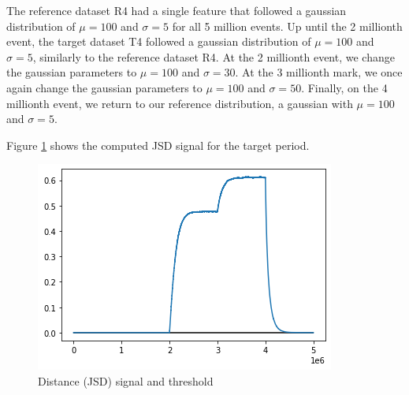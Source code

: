 The reference dataset R4 had a single feature that followed a gaussian distribution of $\mu=100$ and $\sigma=5$ for all 5 million events. Up until the 2 millionth event, the target dataset T4 followed a gaussian distribution of $\mu=100$ and $\sigma=5$, similarly to the reference dataset R4. At the 2 millionth event, we change the gaussian parameters to $\mu=100$ and $\sigma=30$. At the 3 millionth mark, we once again change the gaussian parameters to $\mu=100$ and $\sigma=50$. Finally, on the 4 millionth event, we return to our reference distribution, a gaussian with $\mu=100$ and $\sigma=5$.


Figure \ref{fig:JSD-signal-test04} shows the computed JSD signal for the target period.
\begin{figure}[!htb]
    \begin{center}
      \includegraphics[scale=0.6]{figures/stream-analysis-viz-test04.png}
      \caption[]{Distance (JSD) signal and threshold}
      \label{fig:JSD-signal-test04}
    \end{center}
\end{figure}

